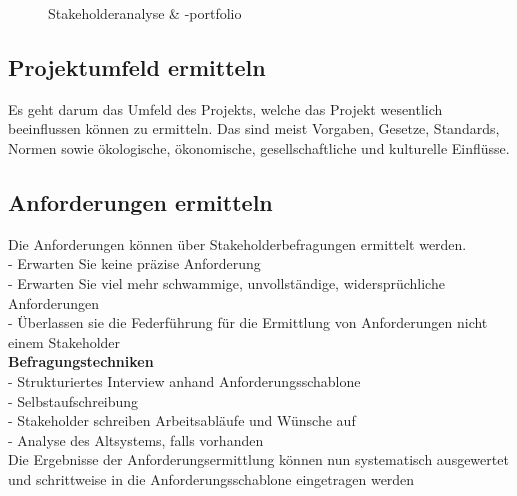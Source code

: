 \begin{figure}[ht]
	\centering
	\caption[]{Stakeholderanalyse \& -portfolio}
\end{figure}

\subsection{Projektumfeld ermitteln}

Es geht darum das Umfeld des Projekts, welche das Projekt wesentlich beeinflussen können zu ermitteln. Das sind meist Vorgaben, Gesetze, Standards, Normen sowie ökologische, ökonomische, gesellschaftliche und kulturelle Einflüsse. 

\subsection{Anforderungen ermitteln}

Die Anforderungen können über Stakeholderbefragungen ermittelt werden. \\
- Erwarten Sie keine präzise Anforderung \\
- Erwarten Sie viel mehr schwammige, unvollständige, widersprüchliche Anforderungen \\
- Überlassen sie die Federführung für die Ermittlung von Anforderungen nicht einem Stakeholder \\

\textbf{Befragungstechniken} \\
- Strukturiertes Interview anhand Anforderungsschablone \\
- Selbstaufschreibung \\
- Stakeholder schreiben Arbeitsabläufe und Wünsche auf \\
- Analyse des Altsystems, falls vorhanden \\
 Die Ergebnisse der Anforderungsermittlung können nun systematisch ausgewertet und schrittweise in die Anforderungsschablone eingetragen werden

